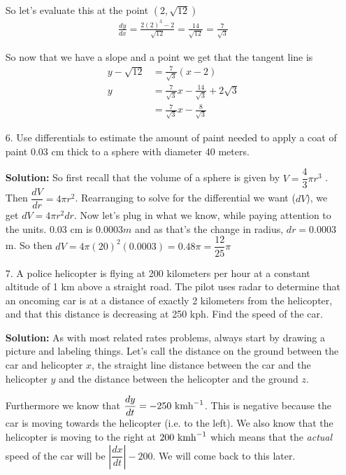 \documentclass[11pt,reqno]{article}
\theoremstyle{definition}
\begin{document}
\begin{enumerate}
		So let's evaluate this at the point $(2, \sqrt{12})$ 
		\begin{align*}
			\frac{dy}{dx} = \frac{2 (2)^3 - 2}{\sqrt{12}} = \frac{14}{\sqrt{12}} = \frac{7}{\sqrt{3}}
		\end{align*}
		
		So now that we have a slope and a point we get that the tangent line is
		\begin{align*}
			y - \sqrt{12} &= \frac{7}{\sqrt{3}} (x - 2) \\
			y &= \frac{7}{\sqrt{3}} x - \frac{14}{\sqrt{3}} + 2\sqrt{3} \\
			&= \frac{7}{\sqrt{3}} x -\frac{8}{\sqrt{3}}
		\end{align*}
		
		\item[6.] Use differentials to estimate the amount of paint needed to apply a coat of paint 0.03 cm thick to a sphere with diameter 40 meters.
		
		\textbf{Solution:} So first recall that the volume of a sphere is given by $V = \dfrac{4}{3} \pi r^3$ . Then $\dfrac{dV}{dr} = 4 \pi r^2$. Rearranging to solve for the differential we want ($dV$), we get $dV = 4 \pi r^2 dr$. Now let's plug in what we know, while paying attention to the units. $0.03$ cm is $0.0003 m$ and as that's the change in radius, $dr =  0.0003$ m. So then $dV = 4 \pi (20)^2 (0.0003) = 0.48 \pi = \dfrac{12}{25} \pi$
		\newpage
		\item[7.] A police helicopter is flying at 200 kilometers per hour at a constant altitude of 1 km above a straight road. The pilot uses radar to determine that an oncoming car is at a distance of exactly 2 kilometers from the helicopter, and that this distance is decreasing at 250 kph. Find the speed of the car.
		
		\textbf{Solution:} As with most related rates problems, always start by drawing a picture and labeling things. Let's call the distance on the ground between the car and helicopter $x$, the straight line distance between the car and the helicopter $y$ and the distance between the helicopter and the ground $z$. 
		
		
		Furthermore we know that $\dfrac{dy}{dt} = - 250 \textnormal{ kmh}^{-1}$. This is negative because the car is moving towards the helicopter (i.e. to the left). We also know that the helicopter is moving to the right at $200 \textnormal{ kmh}^{-1}$ which means that the \emph{actual} speed of the car will be $\left|\dfrac{dx}{dt}\right| - 200$. We will come back to this later. 
		

\end{enumerate}
\end{document}
